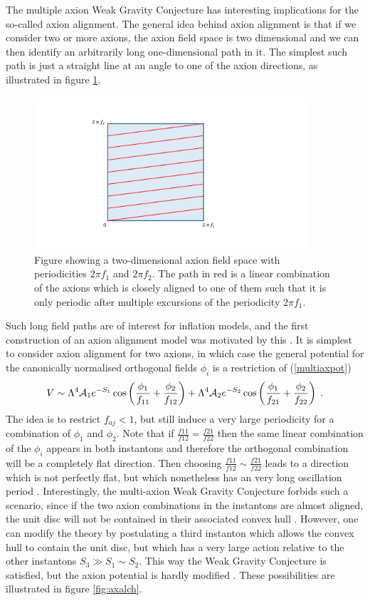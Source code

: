 \documentclass[11pt,a4paper]{article}
\numberwithin{equation}{section}
\numberwithin{table}{section}\setlength{\multlinegap}{25pt}
\newcommand{\be}{\begin{equation}}
\newcommand{\ee}{\end{equation}}
\begin{document}
The multiple axion Weak Gravity Conjecture has interesting implications for the so-called axion alignment. The general idea behind axion alignment is that if we consider two or more axions, the axion field space is two dimensional and we can then identify an arbitrarily long one-dimensional path in it. The simplest such path is just a straight line at an angle to one of the axion directions, as illustrated in figure \ref{fig:genaxal}. 
\begin{figure}[t]
\centering
 \includegraphics[width=0.9\textwidth]{axionalig.pdf}
\caption{Figure showing a two-dimensional axion field space with periodicities $2 \pi f_1$ and $2 \pi f_2$. The path in red is a linear combination of the axions which is closely aligned to one of them such that it is only periodic after multiple excursions of the periodicity $2 \pi f_1$.}
\label{fig:genaxal}
\end{figure}
Such long field paths are of interest for inflation models, and the first construction of an axion alignment model was motivated by this \cite{Kim:2004rp}. It is simplest to consider axion alignment for two axions, in which case the general potential for the canonically normalised orthogonal fields $\phi_i$ is a restriction of (\ref{multiaxpot})
\be
V \sim \Lambda^4 {\cal A}_1 e^{-S_1} \cos \left( \frac{\phi_1}{f_{11}} + \frac{\phi_2}{f_{12}} \right) + \Lambda^4 {\cal A}_2 e^{-S_2} \cos \left( \frac{\phi_1}{f_{21}} + \frac{\phi_2}{f_{22}} \right) \;.
\ee
The idea is to restrict $f_{aj} < 1$, but still induce a very large periodicity for a combination of $\phi_1$ and $\phi_2$. Note that if $\frac{f11}{f12}=\frac{f21}{f22}$ then the same linear combination of the $\phi_i$ appears in both instantons and therefore the orthogonal combination will be a completely flat direction. Then choosing $\frac{f11}{f12}\sim\frac{f21}{f22}$ leads to a direction which is not perfectly flat, but which nonetheless has an very long oscillation period \cite{Kim:2004rp}. Interestingly, the multi-axion Weak Gravity Conjecture forbids such a scenario, since if the two axion combinations in the instantons are almost aligned, the unit disc will not be contained in their associated convex hull \cite{Rudelius:2015xta,Brown:2015iha}. However, one can modify the theory by postulating a third instanton which allows the convex hull to contain the unit disc, but which has a very large action relative to the other instantons $S_3 \gg S_1 \sim S_2$. This way the Weak Gravity Conjecture is satisfied, but the axion potential is hardly modified \cite{Rudelius:2015xta,Brown:2015iha}. These possibilities are illustrated in figure \ref{fig:axalch}. 
\end{document}
